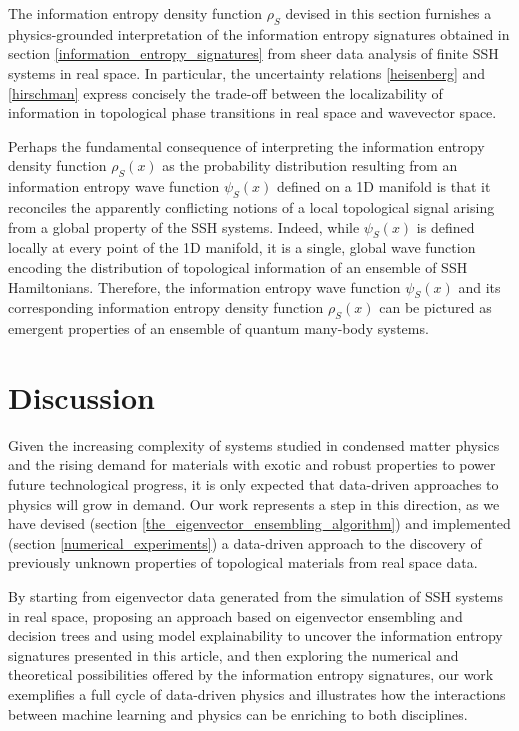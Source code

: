 \documentclass[10pt]{revtex4-1}
\begin{document}
The information entropy density function $\rho_S$ devised in this section furnishes a physics-grounded interpretation of the information entropy signatures obtained in section \ref{information_entropy_signatures} from sheer data analysis of finite SSH systems in real space. In particular, the uncertainty relations \eqref{heisenberg} and \eqref{hirschman} express concisely the trade-off between the localizability of information in topological phase transitions in real space and wavevector space. 

Perhaps the fundamental consequence of interpreting the information entropy density function $\rho_S(x)$ as the probability distribution resulting from an information entropy wave function $\psi_S(x)$ defined on a 1D manifold is that it reconciles the apparently conflicting notions of a local topological signal arising from a global property of the SSH systems. Indeed, while $\psi_S(x)$ is defined locally at every point of the 1D manifold, it is a single, global wave function encoding the distribution of topological information of an ensemble of SSH Hamiltonians. Therefore, the information entropy wave function $\psi_S(x)$ and its corresponding information entropy density function $\rho_S(x)$ can be pictured as emergent properties of an ensemble of quantum many-body systems.    

\section{Discussion}
\label{discussion}

Given the increasing complexity of systems studied in condensed matter physics and the rising demand for materials with exotic and robust properties to power future technological progress, it is only expected that data-driven approaches to physics will grow in demand. Our work represents a step in this direction, as we have devised (section \ref{the_eigenvector_ensembling_algorithm}) and implemented (section \ref{numerical_experiments}) a data-driven approach to the discovery of previously unknown properties of topological materials from real space data.

By starting from eigenvector data generated from the simulation of SSH systems in real space, proposing an approach based on eigenvector ensembling and decision trees and using model explainability to uncover the information entropy signatures presented in this article, and then exploring the numerical and theoretical possibilities offered by the information entropy signatures, our work exemplifies a full cycle of data-driven physics and illustrates how the interactions between machine learning and physics can be enriching to both disciplines.      
 
\end{document}
